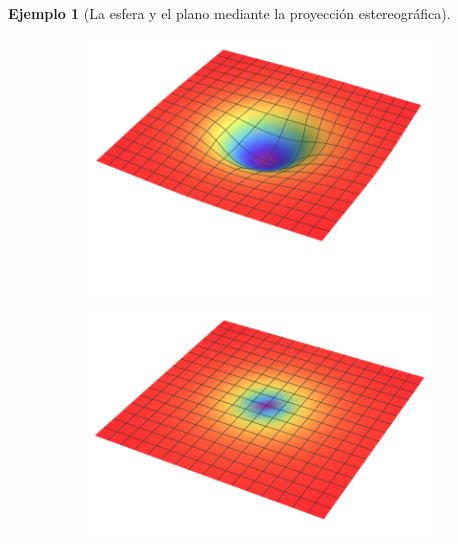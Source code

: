 \documentclass[spanish]{book}
\theoremstyle{definition}
\newtheorem*{ejem}{Ejemplo}
\begin{document}
\begin{ejem}[La esfera y el plano mediante la proyección estereográfica]
\begin{figure}[H]
\begin{subfigure}{.25\textwidth}
		\end{subfigure}\hspace{-.2cm}
		\begin{subfigure}{0.25\textwidth}
			\centering
			\includegraphics[width=\linewidth]{sup26}
		\end{subfigure}\hspace{-.2cm}
		\begin{subfigure}{0.25\textwidth}
			\centering
			\includegraphics[width=\linewidth]{sup27}
		\end{subfigure}\hspace{-.2cm}
		\begin{subfigure}{0.25\textwidth}
			\centering

\end{subfigure}
\end{figure}
\end{ejem}
\end{document}
